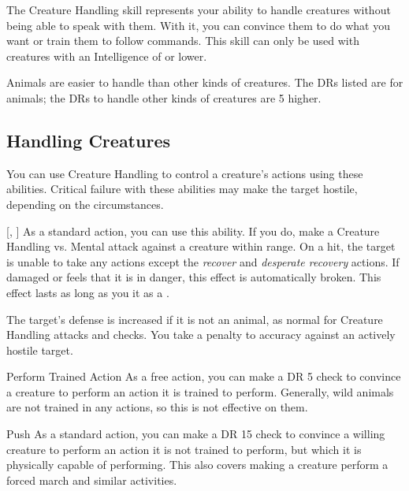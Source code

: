 \newpage
{}
    The Creature Handling skill represents your ability to handle creatures without being able to speak with them. With it, you can convince them to do what you want or train them to follow commands. This skill can only be used with creatures with an Intelligence of  or lower.

        Animals are easier to handle than other kinds of creatures.
        The DRs listed are for animals; the DRs to handle other kinds of creatures are 5 higher.

    \subsection{Handling Creatures}
        You can use Creature Handling to control a creature's actions using these abilities.
        Critical failure with these abilities may make the target hostile, depending on the circumstances.

        \begin{ability}{}[, ]
            As a standard action, you can use this ability.
            If you do, make a Creature Handling vs. Mental attack against a creature within \rngmed range.
            On a hit, the target is unable to take any actions except the \textit{recover} and \textit{desperate recovery} actions.
            If damaged or feels that it is in danger, this effect is automatically broken.
            This effect lasts as long as you  it as a .

            The target's defense is increased if it is not an animal, as normal for Creature Handling attacks and checks.
            You take a  penalty to accuracy against an actively hostile target.
        \end{ability}

        \begin{ability}{Perform Trained Action}
            As a free action, you can make a DR 5 check to convince a creature to perform an action it is trained to perform. Generally, wild animals are not trained in any actions, so this is not effective on them.
        \end{ability}

        \begin{ability}{Push}
            As a standard action, you can make a DR 15 check to convince a willing creature to perform an action it is not trained to perform, but which it is physically capable of performing. This also covers making a creature perform a forced march and similar activities.
        \end{ability}

